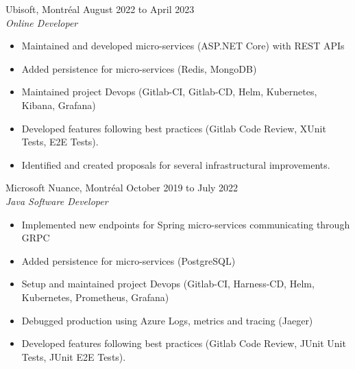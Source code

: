 \documentclass{res}
\newcommand{\inEnglish}[1]{#1}
\begin{document}
\begin{resume}
%
%	

\inEnglish{
	Ubisoft, Montréal
	\hfill August 2022 to April 2023 \\
	{\sl Online Developer}
	\vspace{0.05in}

	\begin{itemize} \itemsep -2pt
		\item Maintained and developed micro-services (ASP.NET Core) with REST APIs
		\item Added persistence for micro-services (Redis, MongoDB)
		\item Maintained project Devops (Gitlab-CI, Gitlab-CD, Helm, Kubernetes, Kibana, Grafana)
		\item Developed features following best practices (Gitlab Code Review, XUnit Tests, E2E Tests).
		\item Identified and created proposals for several infrastructural improvements.
	\end{itemize}

	Microsoft Nuance, Montréal
	\hfill October 2019 to July 2022 \\
	{\sl Java Software Developer}
	\vspace{0.05in}

	\begin{itemize} \itemsep -2pt
		\item Implemented new endpoints for Spring micro-services communicating through GRPC
		\item Added persistence for micro-services (PostgreSQL)
		\item Setup and maintained project Devops (Gitlab-CI, Harness-CD, Helm, Kubernetes, Prometheus, Grafana)
		\item Debugged production using Azure Logs, metrics and tracing (Jaeger)
	    \item Developed features following best practices (Gitlab Code Review, JUnit Unit Tests, JUnit E2E Tests).
	\end{itemize}

}
\end{resume}
\end{document}
